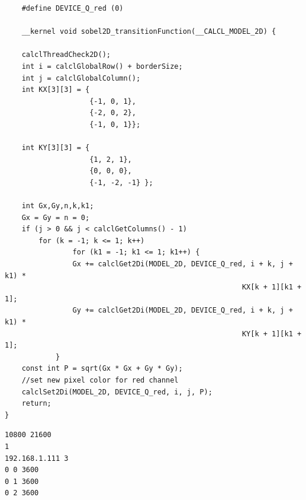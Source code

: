 \begin{lstlisting}
	#define DEVICE_Q_red (0)
	
	__kernel void sobel2D_transitionFunction(__CALCL_MODEL_2D) {
	
	calclThreadCheck2D();
	int i = calclGlobalRow() + borderSize;
	int j = calclGlobalColumn();
	int KX[3][3] = {
					{-1, 0, 1},
					{-2, 0, 2},
					{-1, 0, 1}};
	
	int KY[3][3] = {
					{1, 2, 1},
					{0, 0, 0},
					{-1, -2, -1} };
	
	int Gx,Gy,n,k,k1;
	Gx = Gy = n = 0;
	if (j > 0 && j < calclGetColumns() - 1)
		for (k = -1; k <= 1; k++)
				for (k1 = -1; k1 <= 1; k1++) {
				Gx += calclGet2Di(MODEL_2D, DEVICE_Q_red, i + k, j + k1) *
														KX[k + 1][k1 + 1];
				Gy += calclGet2Di(MODEL_2D, DEVICE_Q_red, i + k, j + k1) *
														KY[k + 1][k1 + 1];
			}
	const int P = sqrt(Gx * Gx + Gy * Gy);
	//set new pixel color for red channel
	calclSet2Di(MODEL_2D, DEVICE_Q_red, i, j, P);
	return;
}

\end{lstlisting}


\begin{lstlisting}[float]
10800 21600
1
192.168.1.111 3
0 0 3600
0 1 3600
0 2 3600
\end{lstlisting}




